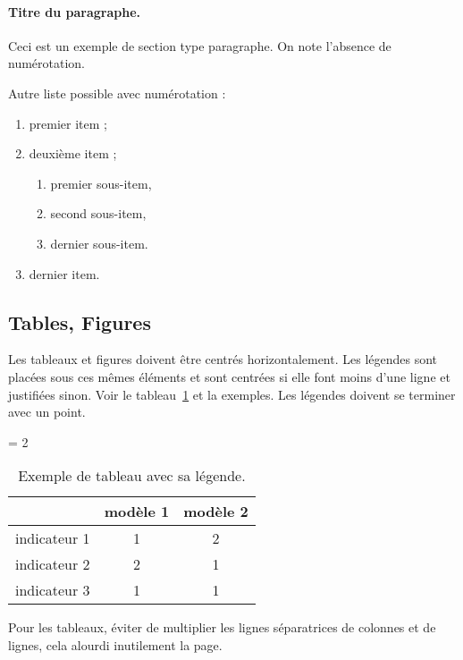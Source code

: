 \documentclass[a4paper,pagenum,french,showlayout]{rnti}
\begin{document}
\paragraph{Titre du paragraphe.} Ceci est un exemple de section type
paragraphe. On note l'absence de numérotation.



Autre liste possible avec numérotation :
\begin{enumerate}
    \item premier item ;
    \item deuxième item ;
    \begin{enumerate}
      \item premier sous-item,
      \item second sous-item,
      \item dernier sous-item.
    \end{enumerate}
  \item dernier item.
\end{enumerate}

\subsection{Tables, Figures}


Les tableaux et figures doivent être centrés horizontalement. Les
légendes sont placées sous ces mêmes éléments et sont centrées si
elle font moins d'une ligne et justifiées sinon. Voir le
tableau~\ref{tab_exemple} et la %
exemples. Les légendes doivent se terminer avec un point.



\begin{table}[ht]
 \begin{center}
   \tabcolsep = 2\tabcolsep
   \begin{tabular}{lcc}
   \hline\hline
                & modèle 1 & modèle 2 \\
   \hline
   indicateur 1 & 1        & 2        \\
   indicateur 2 & 2        & 1        \\
   indicateur 3 & 1        & 1        \\
   \hline
   \end{tabular}
\caption{Exemple de tableau avec sa légende.} \label{tab_exemple}
 \end{center}
\end{table}

Pour les tableaux, éviter de multiplier les lignes séparatrices de
colonnes et de lignes, cela alourdi inutilement la page.
\end{document}
